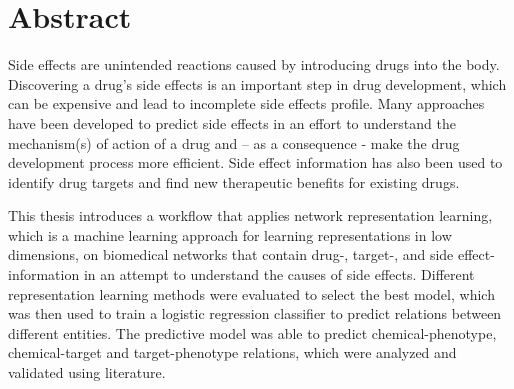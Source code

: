 \chapter*{Abstract}

Side effects are unintended reactions caused by introducing drugs into the body.
Discovering a drug’s side effects is an important step in drug development, which can be expensive and lead to incomplete side effects profile.
Many approaches have been developed to predict side effects in an effort to understand the mechanism(s) of action of a drug and – as a consequence - make the drug development process more efficient.
Side effect information has also been used to identify drug targets and find new therapeutic benefits for existing drugs.

This thesis introduces a workflow that applies network representation learning, which is a machine learning approach for learning representations in low dimensions, on biomedical networks that contain drug-, target-, and side effect-information in an attempt to understand the causes of side effects.
Different representation learning methods were evaluated to select the best model, which was then used to train a logistic regression classifier to predict relations between different entities.
The predictive model was able to predict chemical-phenotype, chemical-target and target-phenotype relations, which were analyzed and validated using literature.
